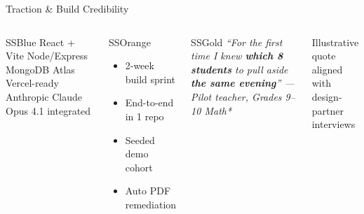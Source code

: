 \documentclass[aspectratio=169,10pt]{beamer}
\begin{document}
\begin{frame}{Traction \& Build Credibility}
  \begin{columns}[T]

    \vspace{0.25cm}
    \begin{callout}[title={\faIcon{code-branch}\; Open & Deployable}]{SSBlue}
      \footnotesize React + Vite \textbullet{} Node/Express \textbullet{} MongoDB Atlas \textbullet{}
      Vercel-ready \textbullet{} Anthropic Claude Opus 4.1 integrated
    \end{callout}

    \begin{callout}[title={\faIcon{rocket}\; Hackathon Sprint Stats}]{SSOrange}
      \footnotesize
      \begin{itemize}\setlength\itemsep{0.15em}
        \item 2-week build sprint
        \item End-to-end in 1 repo
        \item Seeded demo cohort
        \item Auto PDF remediation
      \end{itemize}
    \end{callout}
    \vspace{0.12cm}
    \begin{callout}[title={\faIcon{star}\; Design Partner Feedback*}]{SSGold}
      \footnotesize\itshape
      ``For the first time I knew \textbf{which 8 students} to pull aside \textbf{the same evening}'' — Pilot teacher, Grades 9–10 Math*
    \end{callout}
    \tiny *Illustrative quote aligned with design-partner interviews
  \end{columns}
\end{frame}
\end{document}
